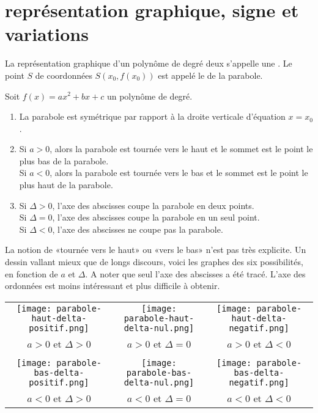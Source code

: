 \documentclass[cours]{lycee-deveaux}
\begin{document}
%
%
%
%
%
\section{représentation graphique, signe et variations}

\begin{definition}
  La représentation graphique d'un polynôme de degré deux s'appelle une .
  Le point $S$ de coordonnées $S\left(x_0, f(x_0)\right)$ est appelé le  de la parabole.
\end{definition}

\begin{propriete}
  \label{propriete-graphe}
  Soit $f(x)=ax^2+bx+c$ un polynôme de degré.
  \begin{enumerate}
  \item
    La parabole est symétrique par rapport à la droite verticale d'équation $x=x_0$.
  \item
    Si $a>0$, alors la parabole est tournée vers le haut et le sommet est le point le plus bas de la parabole.\\
    Si $a<0$, alors la parabole est tournée vers le bas et le sommet est le point le plus haut de la parabole.
  \item
    Si $\Delta>0$, l'axe des abscisses coupe la parabole en deux points.\\
    Si $\Delta=0$, l'axe des abscisses coupe la parabole en un seul point.\\
    Si $\Delta<0$, l'axe des abscisses ne coupe pas la parabole.
  \end{enumerate}
\end{propriete}

La notion de «tournée vers le haut» ou «vers le bas» n'est pas très explicite.
Un dessin vallant mieux que de longs discours, voici les graphes des six possibilités, en fonction de $a$ et $\Delta$.
A noter que seul l'axe des abscisses a été tracé. L'axe des ordonnées est moins intéressant et plus difficile à obtenir.

\begin{center}
  \begin{tabular}{ccc}
    \texttt{[image: parabole-haut-delta-positif.png]} &
    \texttt{[image: parabole-haut-delta-nul.png]} &
    \texttt{[image: parabole-haut-delta-negatif.png]} \\
    $a>0$  et $\Delta>0$ & $a>0$ et $\Delta=0$ & $a>0$ et $\Delta<0$ \\
    & \vspace{1cm}& \\
    \texttt{[image: parabole-bas-delta-positif.png]} &
    \texttt{[image: parabole-bas-delta-nul.png]} &
    \texttt{[image: parabole-bas-delta-negatif.png]} \\
    $a<0$ et $\Delta>0$ & $a<0$ et $\Delta=0$ & $a<0$ et $\Delta<0$ \\
  \end{tabular}
\end{center}
\end{document}
